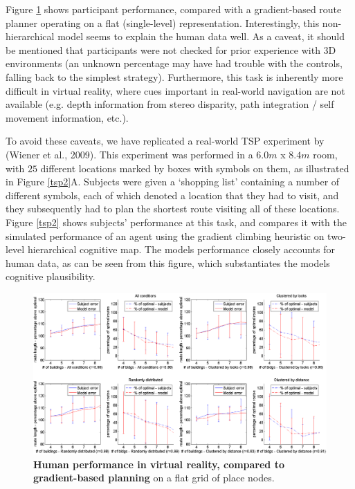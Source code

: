 Figure \ref{tsp} shows participant performance, compared with a gradient-based route planner operating on a flat (single-level) representation. Interestingly, this non-hierarchical model seems to explain the human data well. As a caveat, it should be mentioned that participants were not checked for prior experience with 3D environments (an unknown percentage may have had trouble with the controls, falling back to the simplest strategy). Furthermore, this task is inherently more difficult in virtual reality, where cues important in real-world navigation are not available (e.g. depth information from stereo disparity, path integration / self movement information, etc.).

To avoid these caveats, we have replicated a real-world TSP experiment by (Wiener et al., 2009). This experiment was performed in a $6.0m$ x $8.4m$ room, with $25$ different locations marked by boxes with symbols on them, as illustrated in Figure \ref{tsp2}A. Subjects were given a `shopping list' containing a number of different symbols, each of which denoted a location that they had to visit, and they subsequently had to plan the shortest route visiting all of these locations. Figure \ref{tsp2} shows subjects' performance at this task, and compares it with the simulated performance of an agent using the gradient climbing heuristic on two-level hierarchical cognitive map. The models performance closely  accounts for human data, as  can  be  seen  from  this  figure,  which  substantiates  the  models  cognitive plausibility.


\begin{figure}[!ht]
	\begin{center}
		\includegraphics[width=\textwidth]{img/tsperrors2}
	\end{center}
	\caption[Human performance in virtual reality, compared to gradient-based planning]{
		{\bf Human performance in virtual reality, compared to gradient-based planning} on a flat grid of place nodes. 
	}
	\label{tsp}
\end{figure}

